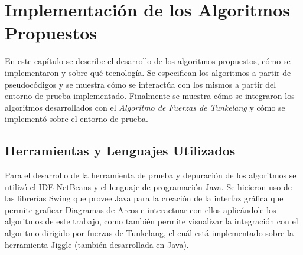 \chapter{Implementación de los Algoritmos Propuestos}\label{cap4}


En este capítulo se describe el desarrollo de los algoritmos propuestos, cómo se implementaron y sobre qué tecnología. Se especifican los algoritmos a partir de pseudocódigos y se muestra cómo se interactúa con los mismos a partir del entorno de prueba implementado. Finalmente se muestra cómo se integraron los algoritmos desarrollados con el \emph{Algoritmo de Fuerzas de Tunkelang} y cómo se implementó sobre el entorno de prueba.

\section{Herramientas y Lenguajes Utilizados}
Para el desarrollo de la herramienta de prueba y depuración de los algoritmos se utilizó el IDE NetBeans y el lenguaje de programación Java. Se hicieron uso de las librerías Swing que provee Java para la creación de la interfaz gráfica que permite graficar Diagramas de Arcos e interactuar con ellos aplicándole los algoritmos de este trabajo, como también permite visualizar la integración con el algoritmo dirigido por fuerzas de Tunkelang, el cuál está implementado sobre la herramienta Jiggle (también desarrollada en Java).

